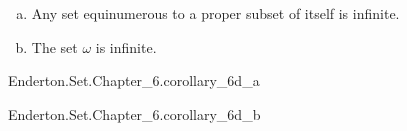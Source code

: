 \documentclass{report}
\begin{document}
\subsection{}%

  \begin{corollary}[6D]
    \  %
    \begin{enumerate}[(a)]
      \item Any set equinumerous to a proper subset of itself is infinite.
      \item The set $\omega$ is infinite.
    \end{enumerate}
  \end{corollary}

    {Enderton.Set.Chapter\_6.corollary\_6d\_a}

    {Enderton.Set.Chapter\_6.corollary\_6d\_b}
\end{document}
